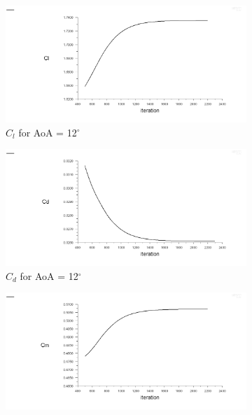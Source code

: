 \begin{figure}[H]
  \begin{subfigure}[b]{0.5\textwidth}
    \includegraphics[width=\textwidth]{12_deg/AoA_12_cl.png}
    \caption{$C_l$ for AoA = 12$^\circ$}
    \label{fig:aoa_12_cl}
  \end{subfigure}
  \hfill
  \begin{subfigure}[b]{0.5\textwidth}
    \includegraphics[width=\textwidth]{12_deg/AoA_12_cd.png}
    \caption{$C_d$ for AoA = 12$^\circ$}
    \label{fig:aoa_12_cd}
  \end{subfigure}
  \begin{subfigure}[b]{0.5\textwidth}
    \includegraphics[width=\textwidth]{12_deg/AoA_12_cm.png}

\end{subfigure}
\end{figure}
